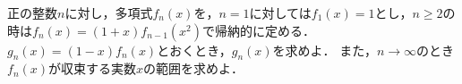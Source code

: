 正の整数$n$に対し，多項式$f_n(x)$を，$n=1$に対しては$f_1(x)=1$とし，$n\ge 2$の時は$f_n(x)=(1+x)f_{n-1}(x^2)$で帰納的に定める．
$g_n(x)=(1-x)f_n(x)$とおくとき，$g_n(x)$を求めよ．
また，$n\to\infty$のとき$f_n(x)$が収束する実数$x$の範囲を求めよ．

